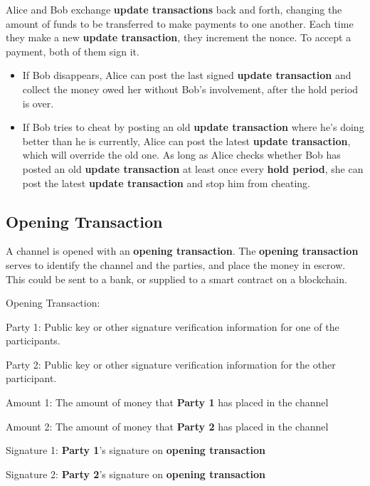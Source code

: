 \documentclass[a4paper]{article}
\newcommand{\bgls}[1]{\textbf{\gls{#1}}}
\newcommand{\bglspl}[1]{\textbf{\glspl{#1}}}
\newenvironment{mydescription}
{\begin{description}
\setlength{\itemsep}{5pt}
  \setlength{\parskip}{0pt}
  \setlength{\labelsep}{5pt}
}{
\end{description}}
\begin{document}
Alice and Bob exchange \bglspl{update transaction} back and forth, changing the amount of funds to be transferred to make payments to one another. Each time they make a new \bgls{update transaction}, they increment the nonce. To accept a payment, both of them sign it.

\begin{itemize}
\item If Bob disappears, Alice can post the last signed \bgls{update transaction} and collect the money owed her without Bob's involvement, after the hold period is over.

\item If Bob tries to cheat by posting an old \bgls{update transaction} where he's doing better than he is currently, Alice can post the latest \bgls{update transaction}, which will override the old one. As long as Alice checks whether Bob has posted an old \bgls{update transaction} at least once every \bgls{hold period}, she can post the latest \bgls{update transaction} and stop him from cheating.
\end{itemize}


\subsection{Opening Transaction}

A channel is opened with an \bgls{opening transaction}. The \bgls{opening transaction} serves to identify the channel and the parties, and place the money in escrow. This could be sent to a bank, or supplied to a smart contract on a blockchain.

\begin{mdframed}[style=message]
\begin{mydescription}
\item[Opening Transaction:] \hfill
  \begin{mydescription}
  \item[Party 1:] Public key or other signature verification information for one of the participants.
  \item[Party 2:] Public key or other signature verification information for the other participant.
  \item[Amount 1:] The amount of money that \textbf{Party 1} has placed in the channel
  \item[Amount 2:] The amount of money that \textbf{Party 2} has placed in the channel
  \end{mydescription}
\item[Signature 1:] \textbf{Party 1}'s signature on \bgls{opening transaction}
\item[Signature 2:] \textbf{Party 2}'s signature on \bgls{opening transaction}
\end{mydescription}
\end{mdframed}
\end{document}
